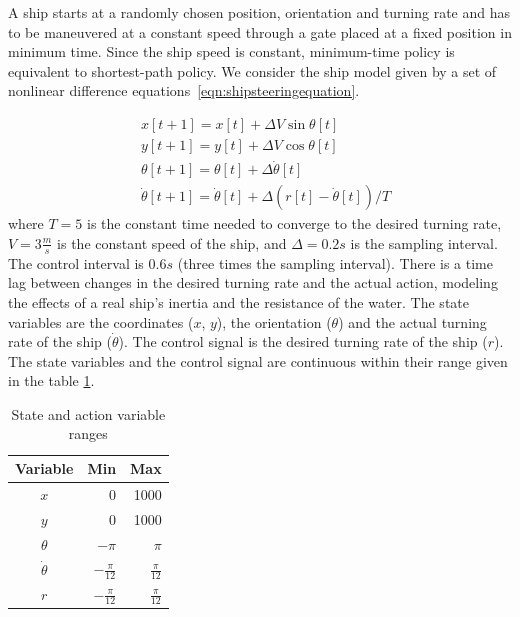 A ship starts at a randomly chosen position, orientation and turning rate and has to be maneuvered at a constant speed through a gate placed at a fixed position in minimum time. Since the ship speed is constant, minimum-time policy is equivalent to shortest-path policy. We consider the ship model given by a set of nonlinear difference equations~\ref{eqn:shipsteeringequation}.

\begin{equation}
\label{eqn:shipsteeringequation}
\begin{split}
     &x\left[t+1 \right] = x[t] + \Delta V \sin \theta \left[t\right]\\
     &y\left[t+1 \right] = y[t] + \Delta V \cos \theta \left[t\right]\\
     &\theta\left[t+1 \right] = \theta[t] + \Delta \dot{\theta} \left[t\right]\\
     &\dot{\theta} \left[t+1\right] =  \dot{\theta} \left[t\right] +\Delta (r\left[t\right] - \dot{\theta}\left[t\right])/T
\end{split}
\end{equation}
where $T = 5$ is the constant time needed to converge to the desired turning rate, $V = 3\frac{m}{s}$ is the constant speed of the ship, and $\Delta = 0.2 s$ is the sampling interval. The control interval is $0.6 s$ (three times the sampling interval).
There is a time lag between changes in the desired turning rate and the actual action, modeling the effects of a real ship’s inertia and the resistance of the water. The state variables are the coordinates ($x$, $y$), the orientation ($\theta$) and the actual turning rate of the ship ($\dot{\theta}$). The control signal is the desired turning rate of the ship ($r$). The state variables and the control signal are continuous within their range given in the table \ref{table:ranges}.

\begin{table}[t]
  \centering
  \begin{tabular}{c r r}
     \toprule
     Variable & Min & Max \\
     \midrule
     $x$ & 0 & 1000 \\ 
     $y$ & 0 & 1000 \\
     $\theta$ & $-\pi$ & $\pi$ \\
     $\dot{\theta}$ & $-\frac{\pi}{12}$ & $\frac{\pi}{12}$ \\
     $r$ & $-\frac{\pi}{12}$ & $\frac{\pi}{12}$ \\
     \bottomrule
  \end{tabular}
  \caption{State and action variable ranges}
  \label{table:ranges}
\end{table}


